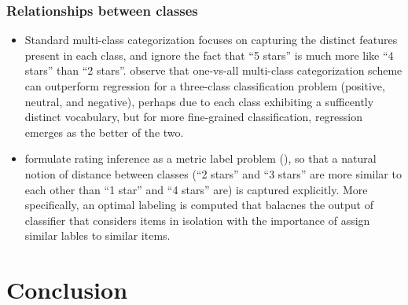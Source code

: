 \documentclass{article}
\begin{document}
    \subsection{Relationships between classes}
      \begin{itemize}
        \item Standard multi-class categorization focuses on capturing the
distinct features present in each class, and ignore the fact that ``5 stars'' is
much more like ``4 stars'' than ``2 stars''. \cite{Pang2005} observe that
one-vs-all multi-class categorization scheme can outperform regression for a
three-class classification problem (positive, neutral, and negative), perhaps
due to each class exhibiting a sufficently distinct vocabulary, but for more
fine-grained classification, regression emerges as the better of the two.
        \item \cite{Pang2005} formulate rating inference as a metric label
problem (\cite{Kleinberg2002}), so that a natural notion of distance between
classes (``2 stars'' and ``3 stars'' are more similar to each other than ``1
star'' and ``4 stars'' are) is captured explicitly. More specifically, an
optimal labeling is computed that balacnes the output of classifier that
considers items in isolation with the importance of assign similar lables to
similar items.
      \end{itemize}

\chapter{Conclusion}



\end{document}
